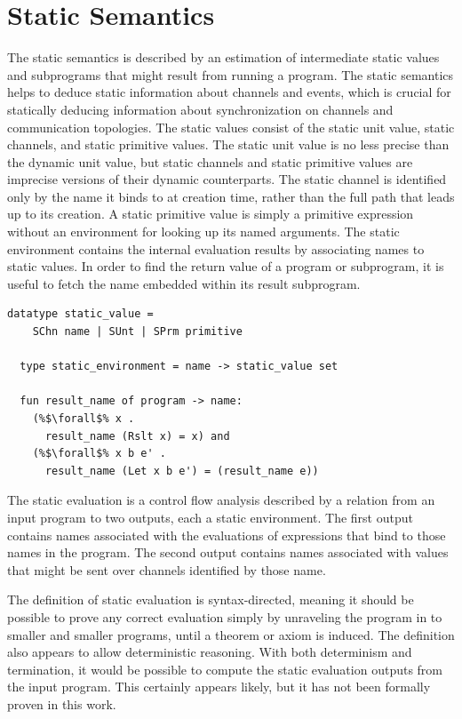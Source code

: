 \documentclass{article}
\begin{document}
\section{Static Semantics}
The static semantics is described by an estimation of intermediate static values and subprograms
that might result from running a program.    
The static semantics helps to deduce static information about channels and events, which is
crucial for statically deducing information about synchronization on channels and
communication topologies.
The static values consist of the static unit value, static channels, and static primitive
values. The static unit value is no less precise than the dynamic unit value, but
static channels and static primitive values are imprecise versions of their dynamic
counterparts. The static channel is identified only by the name it binds to at creation time,
rather than the full path that leads up to its creation.  A static primitive value is simply a
primitive expression without an environment for looking up its named arguments. The static
environment contains the internal evaluation results by associating names to static values.
In order to find the return value of a program or subprogram, it is useful to fetch the name
embedded within its result subprogram.

\begin{lstlisting}[language=logic, escapechar=\%]
  datatype static_value =
    SChn name | SUnt | SPrm primitive 

  type static_environment = name -> static_value set

  fun result_name of program -> name:
    (%$\forall$% x .
      result_name (Rslt x) = x) and
    (%$\forall$% x b e' . 
      result_name (Let x b e') = (result_name e))
  \end{lstlisting}


The static evaluation is a control flow analysis described by a relation from an input program
to two outputs, each a static environment. The first output contains names associated with the
evaluations of expressions that bind to those names in the program. The second output contains
names associated with values that might be sent over channels identified by those name.

The definition of static evaluation is syntax-directed, meaning it should be possible to
prove any correct evaluation simply by unraveling the program in to smaller and smaller
programs, until a theorem or axiom is induced. The definition also appears to allow
deterministic reasoning. With both determinism and termination, it would be possible to compute
the static evaluation outputs from the input program. This certainly appears likely, but it has
not been formally proven in this work.
\end{document}
